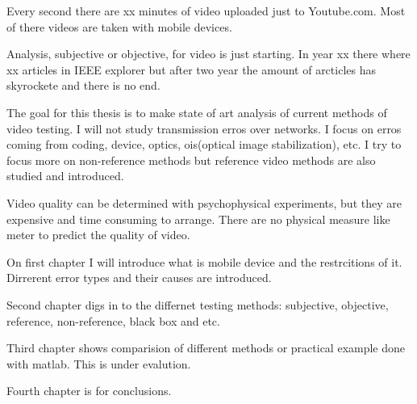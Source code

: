 
Every second there are xx minutes of video uploaded just to Youtube.com. Most
of there videos are taken with mobile devices. 

Analysis, subjective or objective, for video is just starting. In year xx
there where xx articles in IEEE explorer but after two year the amount of
arcticles has skyrockete and there is no end. 

The goal for this thesis is to make state of art analysis of current methods
of video testing. I will not study transmission erros over networks. I focus 
on erros coming from coding, device, optics,
ois(optical image stabilization), etc. I try to focus more on non-reference
methods but reference video methods are also studied and introduced. 

Video quality can be determined with psychophysical experiments, but they are
expensive and time consuming to arrange. There are no physical measure like
meter to predict the quality of video. 

On first chapter I will introduce what is mobile device and the restrcitions
of it. Dirrerent error types and their causes are introduced.

Second chapter digs in to the differnet testing methods: 
subjective, objective, reference, non-reference, black box and etc. 

Third chapter shows comparision of different methods or practical example
done with matlab. This is under evalution. 

Fourth chapter is for conclusions. 
